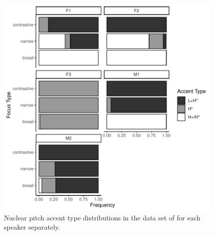 \begin{figure}[p]
\includegraphics[width=.9\textwidth]{figures/ch4/Grice_etal_PA_Types_Speakers.pdf}
\caption{Nuclear pitch accent type distributions in the data set of \citet{Griceetal2017} for each speaker separately.}
\label{fig:grice_etal_2017_PA_types_speakers}
\end{figure}

